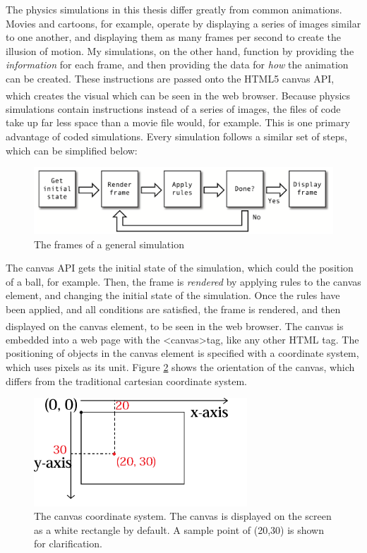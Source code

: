 The physics simulations in this thesis differ greatly from common animations.  Movies and cartoons, for example, operate by displaying a series of images similar to one another, and displaying them as many frames per second to create the illusion of motion.  My simulations, on the other hand, function by providing the \textit{information} for each frame, and then providing the data for \textit{how} the animation can be created.  These instructions are passed onto the HTML5 canvas API, which creates the visual which can be seen in the web browser.\textsuperscript{\cite{basichtml5}}  Because physics simulations contain instructions instead of a series of images, the files of code take up far less space than a movie file would, for example.  This is one primary advantage of coded simulations.  Every simulation follows a similar set of steps, which can be simplified below: 

\begin{figure}[h] 
	\centering
		\includegraphics[width=15cm]{Figures/frames.png}

	\caption{The frames of a general simulation}
	\label{fig:frames}
\end{figure}


The canvas API gets the initial state of the simulation, which could the position of a ball, for example.  Then, the frame is \textit{rendered} by applying rules to the canvas element, and changing the initial state of the simulation.  Once the rules have been applied, and all conditions are satisfied, the frame is rendered, and then displayed on the canvas element, to be seen in the web browser.\textsuperscript{\cite{basichtml5}}  The canvas is embedded into a web page with the \textless canvas\textgreater tag, like any other HTML tag.  The positioning of objects in the canvas element is specified with a coordinate system, which uses pixels as its unit.  Figure \ref{fig:canvas} shows the orientation of the canvas, which differs from the traditional cartesian coordinate system.

\begin{figure}[h] 
	\centering
		\includegraphics[width=8cm]{Figures/canvas.png}

	\caption{The canvas coordinate system.  The canvas is displayed on the screen as a white rectangle by default.  A sample point of (20,30) is shown for clarification.}
	\label{fig:canvas}
\end{figure}



